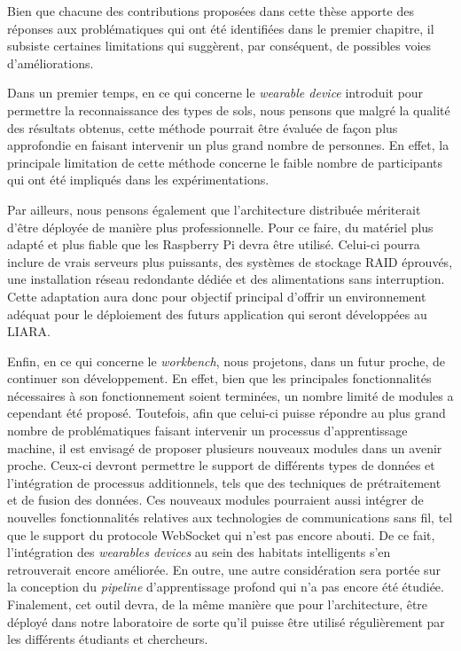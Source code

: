 Bien que chacune des contributions proposées dans cette thèse apporte des réponses aux problématiques qui ont été identifiées dans le premier chapitre, il subsiste certaines limitations qui suggèrent, par conséquent, de possibles voies d'améliorations.

Dans un premier temps, en ce qui concerne le \textit{wearable device} introduit pour permettre la reconnaissance des types de sols, nous pensons que malgré la qualité des résultats obtenus, cette méthode pourrait être évaluée de façon plus approfondie en faisant intervenir un plus grand nombre de personnes. En effet, la principale limitation de cette méthode concerne le faible nombre de participants qui ont été impliqués dans les expérimentations.

Par ailleurs, nous pensons également que l'architecture distribuée mériterait d'être déployée de manière plus professionnelle. Pour ce faire, du matériel plus adapté et plus fiable que les Raspberry Pi devra être utilisé. Celui-ci pourra inclure de vrais serveurs plus puissants, des systèmes de stockage \acs{RAID} éprouvés, une installation réseau redondante dédiée et des alimentations sans interruption. Cette adaptation aura donc pour objectif principal d'offrir un environnement adéquat pour le déploiement des futurs application qui seront développées au \acs{LIARA}.

Enfin, en ce qui concerne le \textit{workbench}, nous projetons, dans un futur proche, de continuer son développement. En effet, bien que les principales fonctionnalités nécessaires à son fonctionnement soient terminées, un nombre limité de modules a cependant été proposé. Toutefois, afin que celui-ci puisse répondre au plus grand nombre de problématiques faisant intervenir un processus d'apprentissage machine, il est envisagé de proposer plusieurs nouveaux modules dans un avenir proche. Ceux-ci devront permettre le support de différents types de données et l'intégration de processus additionnels, tels que des techniques de prétraitement et de fusion des données. Ces nouveaux modules pourraient aussi intégrer de nouvelles fonctionnalités relatives aux technologies de communications sans fil, tel que le support du protocole WebSocket qui n'est pas encore abouti. De ce fait, l'intégration des \textit{wearables devices} au sein des habitats intelligents s'en retrouverait encore améliorée. En outre, une autre considération sera portée sur la conception du \textit{pipeline} d'apprentissage profond qui n'a pas encore été étudiée. Finalement, cet outil devra, de la même manière que pour l'architecture, être déployé dans notre laboratoire de sorte qu'il puisse être utilisé régulièrement par les différents étudiants et chercheurs.

